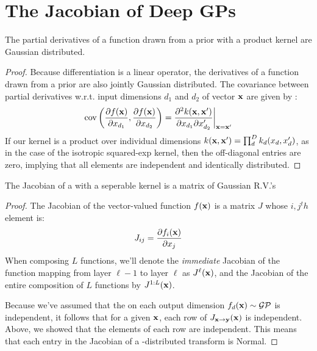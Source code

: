 \documentclass{article}
\newcommand{\Jx}{J_{\vx \rightarrow \vy}}
\newcommand{\Jxx}{J_{\vx \rightarrow \vy}(\vx)}
\begin{document}
\section{The Jacobian of Deep GPs}



\begin{lemma}
The partial derivatives of a function drawn from a \gp{} prior with a product kernel are \iid Gaussian distributed.
\end{lemma}
%
\begin{proof}
Because differentiation is a linear operator, the derivatives of a function drawn from a \gp{} prior are also jointly Gaussian distributed.  The covariance between partial derivatives w.r.t. input dimensions $d_1$ and $d_2$ of vector ${\bf{x}}$ are given by \citep{Solak03derivativeobservations}:
%
\begin{align}
\operatorname{cov} \left( \frac{\partial f({\bf{x}})}{\partial x_{d_1}}, \frac{\partial f({\bf{x}})}{\partial x_{d_2}} \right) 
= \frac{\partial^2 k({\bf{x}}, {\bf{x}}')}{\partial x_{d_1} \partial x_{d_2}'} \bigg|_{{\bf{x}}={\bf{x}}'}
\end{align}
%
If our kernel is a product over individual dimensions $k({\bf{x}}, {\bf{x}}') = \prod_d^D k_d(x_d, x_d')$, as in the case of the isotropic squared-exp kernel, then the off-diagonal entries are zero, implying that all elements are independent and identically distributed.
\end{proof}

\begin{lemma}
The Jacobian of a \gp{} with a seperable kernel is a matrix of \iid Gaussian R.V.'s
\end{lemma}
%
\begin{proof}
The Jacobian of the vector-valued function $f({\bf{x}})$ is a matrix $J$ whose $i,j^th$ element is:
%
\begin{align}
J_{ij} = \dfrac{\partial f_i ({\bf{x}}) }{\partial x_j}
\end{align}
%
When composing $L$ functions, we'll denote the \emph{immediate} Jacobian of the function mapping from layer $\ell -1$ to layer $\ell$ as $J^\ell({\bf{x}})$, and the Jacobian of the entire composition of $L$ functions by $J^{1:L}({\bf{x}})$.

Because we've assumed that the \gp{} on each output dimension $f_d({\bf{x}}) \sim \mathcal{GP}$ is independent, it follows that for a given ${\bf{x}}$, each row of $\Jxx$ is independent.
Above, we showed that the elements of each row are independent.
This means that each entry in the Jacobian of a \gp{}-distributed transform is \iid Normal.
\end{proof}
\end{document}
